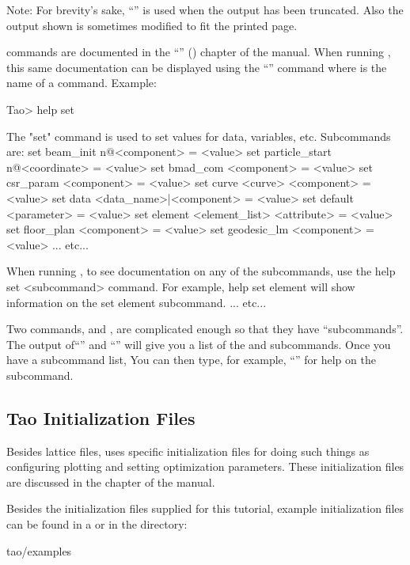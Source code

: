 \documentclass{hitec}     %
\begin{document}
Note: For brevity's sake, ``'' is used when the output has been truncated. Also the output shown
is sometimes modified to fit the printed page.

\tao commands are documented in the ``'' () chapter of the \tao
manual.  When running \tao, this same documentation can be displayed using the ``'' command where  is the name of a command. Example:
\begin{code}
Tao> help set

The "set" command is used to set values for data, variables, etc. 
Subcommands are:
  set beam_init {n@}<component> = <value>
  set particle_start {n@}<coordinate> = <value>
  set bmad_com <component> = <value>
  set csr_param <component> = <value>
  set curve <curve> <component> = <value>
  set data <data_name>|<component> = <value>
  set default <parameter> = <value>
  set element <element_list> <attribute> = <value>
  set floor_plan <component> = <value>
  set geodesic_lm <component> = <value>
... etc...

When running \tao, to see documentation on any of the subcommands, use the 
help set <subcommand> command. For example, help set element
will show information on the set element subcommand.
... etc...
\end{code}

Two commands,  and , are complicated enough so that they have ``subcommands''. The
output of``'' and ``'' will give you a list of the  and 
subcommands. Once you have a subcommand list, You can then type, for example, ``'' for help on the  subcommand.

\subsection{Tao Initialization Files}
\label{s:init.file}

Besides lattice files, \tao uses \tao specific initialization files for doing such things as
configuring plotting and setting optimization parameters. These initialization files are discussed
in the  chapter of the \tao manual.

Besides the initialization files supplied for this tutorial, example \tao initialization files can
be found in a  or  in the directory:
\begin{code}
tao/examples
\end{code}
\end{document}
